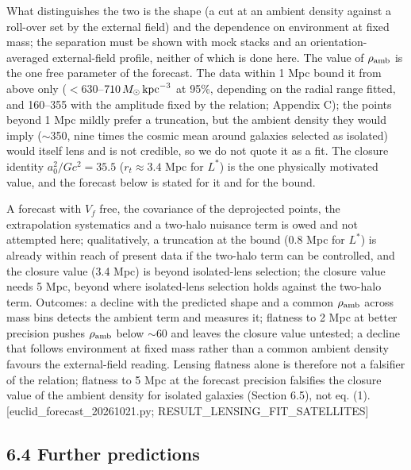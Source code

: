 \documentclass[
  10pt,
]{article}
\begin{document}
What distinguishes the two is the shape (a cut at an ambient density against a roll-over set by the external field) and the dependence on environment at fixed mass; the separation must be shown with mock stacks and an orientation-averaged external-field profile, neither of which is done here. The value of $\rho_{\rm amb}$ is the one free parameter of the forecast. The data within 1 Mpc bound it from above only ($<630$--$710\,M_\odot\,{\rm kpc}^{-3}$ at 95\%, depending on the radial range fitted, and 160--355 with the amplitude fixed by the relation; Appendix C); the points beyond 1 Mpc mildly prefer a truncation, but the ambient density they would imply ($\sim$350, nine times the cosmic mean around galaxies selected as isolated) would itself lens and is not credible, so we do not quote it as a fit. The closure identity $a_0^2/Gc^2=35.5$ ($r_t\approx3.4$ Mpc for $L^*$) is the one physically motivated value, and the forecast below is stated for it and for the bound.

A forecast with $V_f$ free, the covariance of the deprojected points, the extrapolation systematics and a two-halo nuisance term is owed and not attempted here; qualitatively, a truncation at the bound (0.8 Mpc for $L^*$) is already within reach of present data if the two-halo term can be controlled, and the closure value (3.4 Mpc) is beyond isolated-lens selection; the closure value needs 5 Mpc, beyond where isolated-lens selection holds against the two-halo term. Outcomes: a decline with the predicted shape and a common $\rho_{\rm amb}$ across mass bins detects the ambient term and measures it; flatness to 2 Mpc at better precision pushes $\rho_{\rm amb}$ below $\sim$60 and leaves the closure value untested; a decline that follows environment at fixed mass rather than a common ambient density favours the external-field reading. Lensing flatness alone is therefore not a falsifier of the relation; flatness to 5 Mpc at the forecast precision falsifies the closure value of the ambient density for isolated galaxies (Section 6.5), not eq. (1). {[}euclid\_forecast\_20261021.py; RESULT\_LENSING\_FIT\_SATELLITES{]}

\subsection{6.4 Further predictions}
\end{document}

